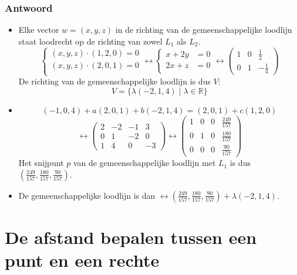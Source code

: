 \documentclass[main.tex]{subfiles}
\begin{document}
\subsubsection*{Antwoord}
\begin{itemize}
\item Elke vector $w=(x,y,z)$ in de richting van de gemeenschappelijke loodlijn staat loodrecht op de richting van zowel $L_{1}$ als $L_{2}$.
  \[
  \left\{
    \begin{array}{cc}
      (x,y,z) \cdot (1,2,0) = 0\\
      (x,y,z) \cdot (2,0,1) = 0\\
    \end{array}
  \right. 
  \longleftrightarrow
  \left\{
    \begin{array}{cc}
      x+2y &= 0\\
      2x+z &= 0\\
    \end{array}
  \right. 
  \longleftrightarrow
  \begin{pmatrix}
    1 & 0 & \frac{1}{2}\\
    0 & 1 & -\frac{1}{4}
  \end{pmatrix}
  \]
  De richting van de gemeenschappelijke loodlijn is dus $V$:
  \[ V = \{ \lambda(-2,1,4)  \mid \lambda \in \mathbb{R} \} \]
\item 
  \[ (-1,0,4) + a (2,0,1) + b (-2,1,4) = (2,0,1) + c(1,2,0) \]
  \[
  \longleftrightarrow
  \begin{pmatrix}
    2 & -2 & -1 & 3\\
    0 & 1 & -2 & 0\\
    1 & 4 & 0 & -3
  \end{pmatrix}
  \longleftrightarrow
  \begin{pmatrix}
    1 & 0 & 0 & \frac{249}{157}\\
    0 & 1 & 0 & \frac{180}{157}\\
    0 & 0 & 0 & \frac{90}{157}
  \end{pmatrix}
  \]
  Het snijpunt $p$ van de gemeenschappelijke loodlijn met $L_{1}$ is dus $\left(\frac{249}{157},\frac{180}{157},\frac{90}{157}\right)$.
\item De gemeenschappelijke loodlijn is dan $\leftrightarrow \left(\frac{249}{157},\frac{180}{157},\frac{90}{157}\right) + \lambda (-2,1,4)$.
\end{itemize}



\newpage
\section{De afstand bepalen tussen een punt en een rechte}
\end{document}
